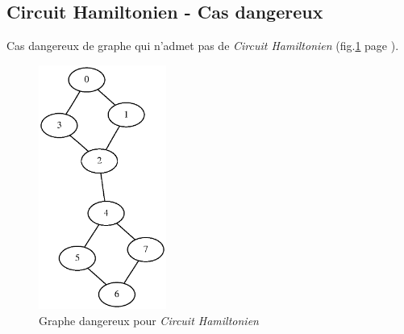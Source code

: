   \newpage

  \subsection{Circuit Hamiltonien - Cas dangereux\label{an_warningCH}}
  Cas dangereux de graphe qui n'admet pas de \emph{Circuit Hamiltonien}
  (fig.\ref{warningCH} page \pageref{warningCH}).
  \begin{figure}[!ht]
   \begin{center}
    \includegraphics[height=8cm]{images/warningCH.eps}
    \caption{Graphe dangereux pour \emph{Circuit
    Hamiltonien}\label{warningCH}}
   \end{center}
  \end{figure}



